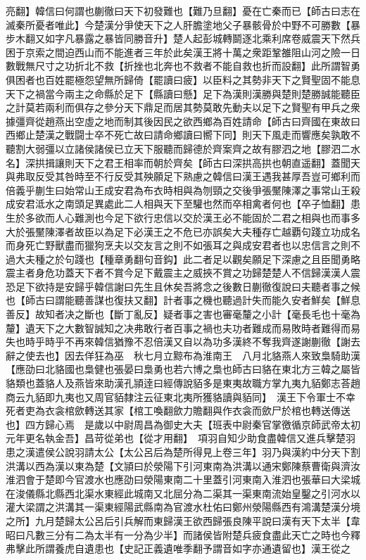 亮翻】韓信曰何謂也蒯徹曰天下初發難也【難乃旦翻】憂在亡秦而已【師古曰志在滅秦所憂者唯此】今楚漢分爭使天下之人肝膽塗地父子暴骸骨於中野不可勝數【暴步木翻又如字凡暴露之暴皆同勝音升】楚人起彭城轉鬬逐北乘利席卷威震天下然兵困于京索之間迫西山而不能進者三年於此矣漢王將十萬之衆距鞏雒阻山河之險一日數戰無尺寸之功折北不救【折挫也北奔也不救者不能自救也折而設翻】此所謂智勇俱困者也百姓罷極怨望無所歸倚【罷讀曰疲】以臣料之其勢非天下之賢聖固不能息天下之禍當今兩主之命縣於足下【縣讀曰懸】足下為漢則漢勝與楚則楚勝誠能聽臣之計莫若兩利而俱存之參分天下鼎足而居其勢莫敢先動夫以足下之賢聖有甲兵之衆據彊齊從趙燕出空虛之地而制其後因民之欲西鄉為百姓請命【師古曰齊國在東故曰西鄉止楚漢之戰闘士卒不死亡故曰請命鄉讀曰嚮下同】則天下風走而響應矣孰敢不聽割大弱彊以立諸侯諸侯已立天下服聽而歸德於齊案齊之故有膠泗之地【膠泗二水名】深拱揖讓則天下之君王相率而朝於齊矣【師古曰深拱高拱也朝直遥翻】蓋聞天與弗取反受其咎時至不行反受其殃願足下熟慮之韓信曰漢王遇我甚厚吾豈可鄉利而倍義乎蒯生曰始常山王成安君為布衣時相與為刎頸之交後爭張黶陳澤之事常山王殺成安君泜水之南頭足異處此二人相與天下至驩也然而卒相禽者何也【卒子恤翻】患生於多欲而人心難測也今足下欲行忠信以交於漢王必不能固於二君之相與也而事多大於張黶陳澤者故臣以為足下必漢王之不危已亦誤矣大夫種存亡越覇句踐立功成名而身死亡野獸盡而獵狗烹夫以交友言之則不如張耳之與成安君者也以忠信言之則不過大夫種之於句踐也【種章勇翻句音鈎】此二者足以觀矣願足下深慮之且臣聞勇略震主者身危功蓋天下者不賞今足下戴震主之威挾不賞之功歸楚楚人不信歸漢漢人震恐足下欲持是安歸乎韓信謝曰先生且休矣吾將念之後數日蒯徹復說曰夫聽者事之候也【師古曰謂能聽善謀也復扶又翻】計者事之機也聽過計失而能久安者鮮矣【鮮息善反】故知者决之斷也【斷丁亂反】疑者事之害也審毫釐之小計【毫長毛也十毫為釐】遺天下之大數智誠知之决弗敢行者百事之禍也夫功者難成而易敗時者難得而易失也時乎時乎不再來韓信猶豫不忍倍漢又自以為功多漢終不奪我齊遂謝蒯徹【謝去辭之使去也】因去佯狂為巫　秋七月立黥布為淮南王　八月北貉燕人來致梟騎助漢【應劭曰北貉國也梟健也張晏曰梟勇也若六博之梟也師古曰貉在東北方三韓之屬皆貉類也蓋貉人及燕皆來助漢孔頴逹曰經傳說貊多是東夷故職方掌九夷九貊鄭志荅趙商云九貊即九夷也又周官貊隸注云征東北夷所獲貉讀與貊同】　漢王下令軍士不幸死者吏為衣衾棺歛轉送其家【棺工喚翻歛力贍翻與作衣衾而歛尸於棺也轉送傳送也】四方歸心焉　是歲以中尉周昌為御史大夫【班表中尉秦官掌徼循京師武帝太初元年更名執金吾】昌苛從弟也【從才用翻】　項羽自知少助食盡韓信又進兵擊楚羽患之漢遣侯公說羽請太公【太公呂后為楚所得見上卷三年】羽乃與漢約中分天下割洪溝以西為漢以東為楚【文頴曰於滎陽下引河東南為洪溝以通宋鄭陳蔡曹衛與濟汝淮泗會于楚即今官渡水也應劭曰滎陽東南二十里蓋引河東南入淮泗也張華曰大梁城在浚儀縣北縣西北渠水東經此城南又北屈分為二渠其一渠東南流始皇鑿之引河水以灌大梁謂之洪溝其一渠東經陽武縣南為官渡水杜佑曰鄭州滎陽縣西有鴻溝楚漢分境之所】九月楚歸太公呂后引兵解而東歸漢王欲西歸張良陳平說曰漢有天下太半【韋昭曰凡數三分有二為太半有一分為少半】而諸侯皆附楚兵疲食盡此天亡之時也今釋弗擊此所謂養虎自遺患也【史記正義遺唯季翻予謂音如字亦通遺留也】漢王從之


